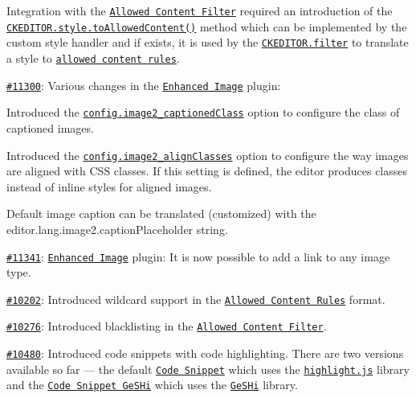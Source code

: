\begin{DoxyItemize}
\begin{DoxyItemize}
\item Integration with the \href{http://docs.ckeditor.com/#!/guide/dev_advanced_content_filter}{\tt Allowed Content Filter} required an introduction of the \href{http://docs.ckeditor.com/#!/api/CKEDITOR.style-method-toAllowedContentRules}{\tt {\ttfamily C\+K\+E\+D\+I\+T\+O\+R.\+style.\+to\+Allowed\+Content()}} method which can be implemented by the custom style handler and if exists, it is used by the \href{http://docs.ckeditor.com/#!/api/CKEDITOR.filter}{\tt {\ttfamily C\+K\+E\+D\+I\+T\+O\+R.\+filter}} to translate a style to \href{http://docs.ckeditor.com/#!/api/CKEDITOR.filter.allowedContentRules}{\tt allowed content rules}.
\end{DoxyItemize}
\item \href{http://dev.ckeditor.com/ticket/11300}{\tt \#11300}\+: Various changes in the \href{http://ckeditor.com/addon/image2}{\tt Enhanced Image} plugin\+:
\begin{DoxyItemize}
\item Introduced the \href{http://docs.ckeditor.com/#!/api/CKEDITOR.config-cfg-image2_captionedClass}{\tt {\ttfamily config.\+image2\+\_\+captioned\+Class}} option to configure the class of captioned images.
\item Introduced the \href{http://docs.ckeditor.com/#!/api/CKEDITOR.config-cfg-image2_alignClasses}{\tt {\ttfamily config.\+image2\+\_\+align\+Classes}} option to configure the way images are aligned with C\+SS classes. If this setting is defined, the editor produces classes instead of inline styles for aligned images.
\item Default image caption can be translated (customized) with the {\ttfamily editor.\+lang.\+image2.\+caption\+Placeholder} string.
\end{DoxyItemize}
\item \href{http://dev.ckeditor.com/ticket/11341}{\tt \#11341}\+: \href{http://ckeditor.com/addon/image2}{\tt Enhanced Image} plugin\+: It is now possible to add a link to any image type.
\item \href{http://dev.ckeditor.com/ticket/10202}{\tt \#10202}\+: Introduced wildcard support in the \href{http://docs.ckeditor.com/#!/guide/dev_allowed_content_rules}{\tt Allowed Content Rules} format.
\item \href{http://dev.ckeditor.com/ticket/10276}{\tt \#10276}\+: Introduced blacklisting in the \href{http://docs.ckeditor.com/#!/guide/dev_advanced_content_filter}{\tt Allowed Content Filter}.
\item \href{http://dev.ckeditor.com/ticket/10480}{\tt \#10480}\+: Introduced code snippets with code highlighting. There are two versions available so far --- the default \href{http://ckeditor.com/addon/codesnippet}{\tt Code Snippet} which uses the \href{http://highlightjs.org}{\tt highlight.\+js} library and the \href{http://ckeditor.com/addon/codesnippetgeshi}{\tt Code Snippet Ge\+S\+Hi} which uses the \href{http://qbnz.com/highlighter/}{\tt Ge\+S\+Hi} library.

\end{DoxyItemize}

